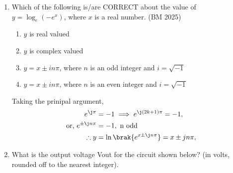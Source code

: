 \begin{enumerate}[label=\thesubsection.\arabic*, ref=\thesubsection.\theenumi]
\item Which of the following is/are CORRECT about the value of $y = \log_e(-e^x)$, where $x$ is a real number.
\hfill  (BM 2025)
\begin{enumerate}
\setlength{\itemsep}{0pt}
    \item $y$ is real valued
    \item $y$ is complex valued
    \item $y = x \pm i n \pi$, where $n$ is an odd integer and $i = \sqrt{-1}$
    \item $y = x \pm i n \pi$, where $n$ is an even integer and $i = \sqrt{-1}$
\end{enumerate}
\solution Taking the prinipal argument,
\begin{align}
e^{\j \pi} &= -1
\implies
e^{\j(2k+1)\pi} = -1,
\\
\text{or, }e^{\pm \j n \pi} &= -1, \text { n odd}
\\
\therefore
y &= \ln \brak{e^{x \pm \j n \pi}} = 
x \pm j n \pi,
\end{align}


\item What is the output voltage Vout for the circuit shown below? \underline{\hspace{2cm}} (in volts, rounded off to the nearest integer).

\begin{center}
\end{center}
\end{enumerate}
